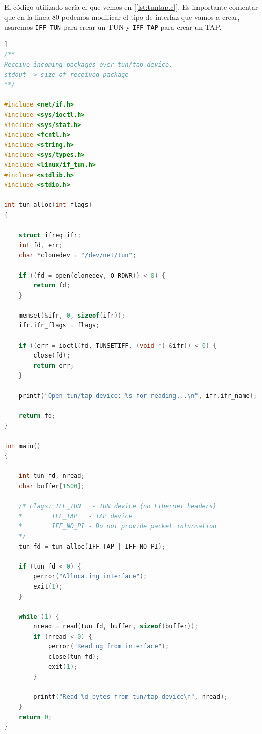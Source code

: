 \documentclass[12pt]{article}
\begin{document}
	\noindent El código utilizado sería el que vemos en [\ref{lst:tuntap.c}]. Es importante comentar que en la linea 80 podemos modificar el tipo de interfaz que vamos a crear, usaremos \texttt{IFF\_TUN} para crear un TUN y \texttt{IFF\_TAP} para crear un TAP.
	\vspace{10px}
	\begin{lstlisting}[language=C, label=lst:tuntap.c, caption=Aplicación de ejemplo para crear tun/tap (tuntap.c) [\ref{bib: code tuntap.c}]]
/**
Receive incoming packages over tun/tap device. 
stdout -> size of received package
**/

#include <net/if.h>
#include <sys/ioctl.h>
#include <sys/stat.h>
#include <fcntl.h>
#include <string.h>
#include <sys/types.h>
#include <linux/if_tun.h>
#include <stdlib.h>
#include <stdio.h>

int tun_alloc(int flags)
{
	
	struct ifreq ifr;
	int fd, err;
	char *clonedev = "/dev/net/tun";
	
	if ((fd = open(clonedev, O_RDWR)) < 0) {
		return fd;
	}
	
	memset(&ifr, 0, sizeof(ifr));
	ifr.ifr_flags = flags;
	
	if ((err = ioctl(fd, TUNSETIFF, (void *) &ifr)) < 0) {
		close(fd);
		return err;
	}
	
	printf("Open tun/tap device: %s for reading...\n", ifr.ifr_name);
	
	return fd;
}

int main()
{
	
	int tun_fd, nread;
	char buffer[1500];
	
	/* Flags: IFF_TUN   - TUN device (no Ethernet headers)
	*        IFF_TAP   - TAP device
	*        IFF_NO_PI - Do not provide packet information
	*/
	tun_fd = tun_alloc(IFF_TAP | IFF_NO_PI);
	
	if (tun_fd < 0) {
		perror("Allocating interface");
		exit(1);
	}
	
	while (1) {
		nread = read(tun_fd, buffer, sizeof(buffer));
		if (nread < 0) {
			perror("Reading from interface");
			close(tun_fd);
			exit(1);
		}
		
		printf("Read %d bytes from tun/tap device\n", nread);
	}
	return 0;
}
	\end{lstlisting}

	\pagebreak
\end{document}
